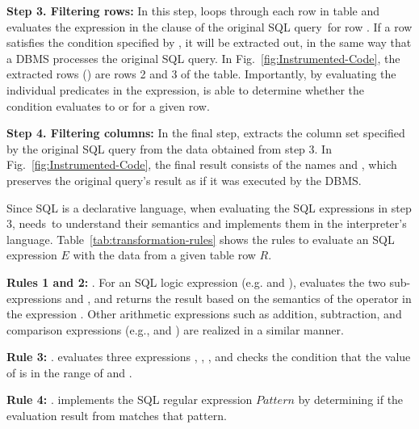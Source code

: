 \vspace{0.04in}
\textbf{Step 3. Filtering rows:} In this step, \tool{} loops through
each row  in table  and evaluates the expression
 in the  clause of the original SQL query~for row .
If a row  satisfies the condition specified
by , it will be extracted out, in the same way that a
DBMS processes the original SQL query. In
Fig.~\ref{fig:Instrumented-Code}, the extracted rows
() are rows 2 and 3 of the 
table. Importantly, by evaluating the individual predicates in the
 expression, \tool{} is able to determine whether the
 condition evaluates to  or  for a
given row.

\vspace{0.04in}
\textbf{Step 4. Filtering columns:} In the final step, \tool{}
extracts the column set specified by the original SQL query from the
data obtained from step 3. In Fig.~\ref{fig:Instrumented-Code}, the
final result consists of the names  and ,
which preserves the original query's result as if it was executed by
the DBMS.



\vspace{0.06in}
Since SQL is a declarative language, when evaluating the SQL expressions
in step 3, \tool{} needs~to understand their semantics and implements
them in the interpreter's
language. Table~\ref{tab:transformation-rules} shows the rules to
evaluate an SQL expression $E$ with the data from a given table row
$R$.

\textbf{Rules 1 and 2:}
. For an SQL logic expression (e.g. 
and ), \tool{} evaluates the two sub-expressions
 and , and returns the result based on the semantics
of the operator in the expression . Other arithmetic
expressions such as addition, subtraction, and comparison expressions
(e.g.,  and ) are realized in a similar
manner.

\textbf{Rule 3:} . \tool{}
evaluates three expressions , , , and
checks the condition that the value of  is in the
range of  and .

\textbf{Rule 4:} . \tool{}
implements the SQL regular expression $Pattern$ by determining if the
evaluation result from  matches that pattern.

